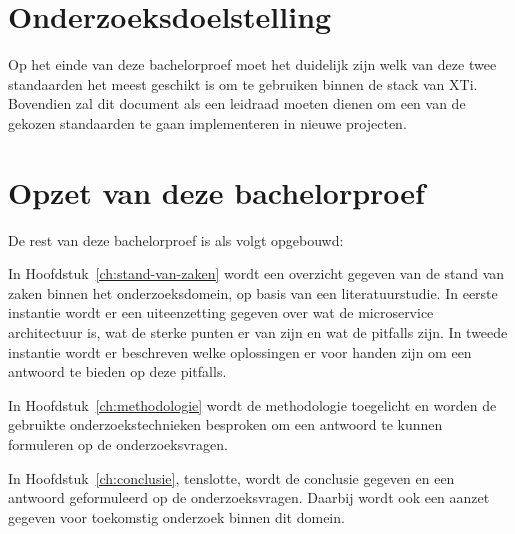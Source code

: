\section{Onderzoeksdoelstelling}
\label{sec:onderzoeksdoelstelling}
Op het einde van deze bachelorproef moet het duidelijk zijn welk van deze twee standaarden het meest geschikt is om te gebruiken binnen de stack van XTi. Bovendien zal dit document als een leidraad moeten dienen om een van de gekozen standaarden te gaan implementeren in nieuwe projecten.

\section{Opzet van deze bachelorproef}
\label{sec:opzet-bachelorproef}


De rest van deze bachelorproef is als volgt opgebouwd:

In Hoofdstuk~\ref{ch:stand-van-zaken} wordt een overzicht gegeven van de stand van zaken binnen het onderzoeksdomein, op basis van een literatuurstudie. In eerste instantie wordt er een uiteenzetting gegeven over wat de microservice architectuur is, wat de sterke punten er van zijn en wat de pitfalls zijn. In tweede instantie wordt er beschreven welke oplossingen er voor handen zijn om een antwoord te bieden op deze pitfalls.

In Hoofdstuk~\ref{ch:methodologie} wordt de methodologie toegelicht en worden de gebruikte onderzoekstechnieken besproken om een antwoord te kunnen formuleren op de onderzoeksvragen.


In Hoofdstuk~\ref{ch:conclusie}, tenslotte, wordt de conclusie gegeven en een antwoord geformuleerd op de onderzoeksvragen. Daarbij wordt ook een aanzet gegeven voor toekomstig onderzoek binnen dit domein.

